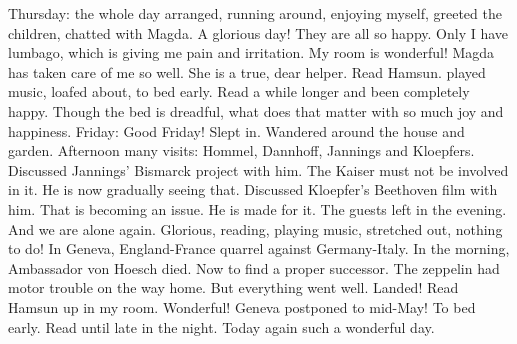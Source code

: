 Thursday: the whole day arranged, running around, enjoying myself, greeted the children, chatted with Magda. A glorious day! They are all so happy. Only I have lumbago, which is giving me pain and irritation. My room is wonderful! Magda has taken care of me so well. She is a true, dear helper. Read Hamsun. played music, loafed about, to bed early. Read a while longer and been completely happy. Though the bed is dreadful, what does that matter with so much joy and happiness. Friday: Good Friday! Slept in. Wandered around the house and garden. Afternoon many visits: Hommel, Dannhoff, Jannings and Kloepfers. Discussed Jannings' Bismarck project with him. The Kaiser must not be involved in it. He is now gradually seeing that. Discussed Kloepfer's Beethoven film with him. That is becoming an issue. He is made for it. The guests left in the evening. And we are alone again. Glorious, reading, playing music, stretched out, nothing to do! In Geneva, England-France quarrel against Germany-Italy. In the morning, Ambassador von Hoesch died. Now to find a proper successor. The zeppelin had motor trouble on the way home. But everything went well. Landed! Read Hamsun up in my room. Wonderful! Geneva postponed to mid-May! To bed early. Read until late in the night.  Today again such a wonderful day.
